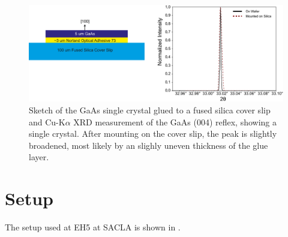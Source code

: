 \begin{figure}[tp]
	\centering
	\includegraphics[width=0.8\linewidth]{images/gaas_sample.pdf}
	\caption[GaAs Sample]{Sketch of the GaAs single crystal glued to a fused silica cover slip and Cu-K$\alpha$ XRD measurement of the GaAs (004) reflex, showing a single crystal. After mounting on the cover slip, the peak is slightly broadened, most likely by an slighly uneven thickness of the glue layer. }
	\label{fig:gaas_sample}
\end{figure}


\section{Setup}
The setup used at EH5 at SACLA is shown in . 

